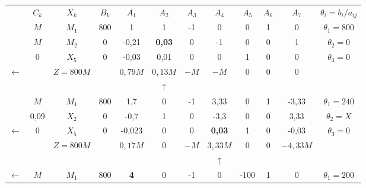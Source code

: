     \begin{tabular}{cccccccccccc}
\cmidrule{2-12}            & $C_k$   & $X_k$   & $B_k$   & $A_1$   & $A_2$   & $A_3$   & $A_4$   & $A_5$   & $A_6$   & $A_7$   & $\theta_i = b_i/a_{ij}$ \\
\cmidrule{2-12}            & $M$     & $M_1$   & 800     & 1       & 1       & -1      & 0       & 0       & 1       & 0       & $\theta_1 = 800$ \\
            & $M$     & \textcolor[rgb]{ 1,  0,  0}{\boldmath{}\textbf{$M_2$}\unboldmath{}} & 0       & -0,21   & \textbf{0,03} & 0       & -1      & 0       & 0       & 1       & \boldmath{}\textbf{$\theta_2 = 0$}\unboldmath{} \\
            & 0       & $X_5$   & 0       & -0,03   & 0,01    & 0       & 0       & 1       & 0       & 0       & $\theta_3 = 0$ \\
\cmidrule{2-12}    $\leftarrow$ &         & $Z=800M$ &         & $0,79 M$ & \textcolor[rgb]{ 0,  .439,  .753}{\boldmath{}\textbf{$0,13 M$}\unboldmath{}} & $-M$    & $-M$    & 0       & 0       & 0       &  \\
\cmidrule{2-12}            &         &         &         &         & $\uparrow$ &         &         &         &         &         &  \\
\cmidrule{2-12}            & $M$     & $M_1$   & 800     & 1,7     & 0       & -1      & 3,33    & 0       & 1       & -3,33   & $\theta_1 = 240$ \\
            & 0,09    & $X_2$   & 0       & -0,7    & 1       & 0       & -3,3    & 0       & 0       & 3,33    & $\theta_2 = X$ \\
    $\leftarrow$ & 0       & \textcolor[rgb]{ 1,  0,  0}{\boldmath{}\textbf{$X_5$}\unboldmath{}} & 0       & -0,023  & 0       & 0       & \textbf{0,03} & 1       & 0       & -0,03   & \boldmath{}\textbf{$\theta_3 = 0$}\unboldmath{} \\
\cmidrule{2-12}            &         & $Z=800M$ &         & $0,17 M$ & 0       & $-M$    & \textcolor[rgb]{ 0,  .439,  .753}{\boldmath{}\textbf{$3,33 M$}\unboldmath{}} & 0       & 0       & $-4,33 M$ &  \\
\cmidrule{2-12}            &         &         &         &         &         &         & $\uparrow$ &         &         &         &  \\
\cmidrule{2-12}    $\leftarrow$ & $M$     & \textcolor[rgb]{ 1,  0,  0}{\boldmath{}\textbf{$M_1$}\unboldmath{}} & 800     & \textbf{4} & 0       & -1      & 0       & -100    & 1       & 0       & \boldmath{}\textbf{$\theta_1 = 200$}\unboldmath{} \\

\end{tabular}
